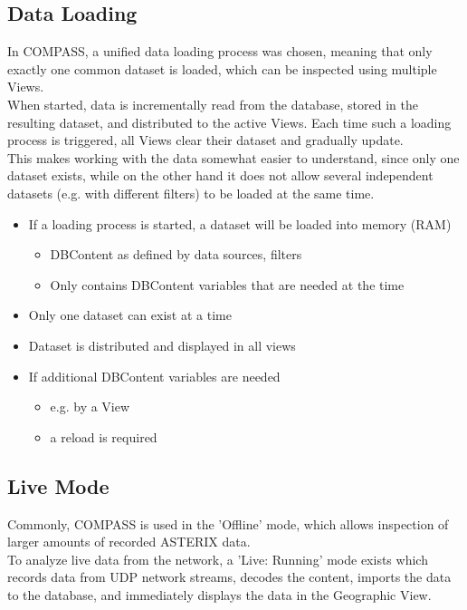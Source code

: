 \subsection*{Data Loading}
In COMPASS, a unified data loading process was chosen, meaning that only exactly one common dataset is loaded, which can be inspected using multiple Views. \\

When started, data is incrementally read from the database, stored in the resulting dataset, and distributed to the active Views. Each time such a loading process is triggered, all Views clear their dataset and gradually update. \\

This makes working with the data somewhat easier to understand, since only one dataset exists, while on the other hand it does not allow several independent datasets (e.g. with different filters) to be loaded at the same time. \\

\begin{itemize}
\item If a loading process is started, a dataset will be loaded into memory (RAM)
\begin{itemize}
\item DBContent as defined by data sources, filters
\item Only contains DBContent variables that are needed at the time
\end{itemize}
\item Only one dataset can exist at a time
\item Dataset is distributed and displayed in all views
\item If additional DBContent variables are needed
\begin{itemize}
\item e.g. by a View
\item a reload is required
\end{itemize}
\end{itemize}

\subsection*{Live Mode}
Commonly, COMPASS is used in the 'Offline' mode, which allows inspection of larger amounts of recorded ASTERIX data. \\

To analyze live data from the network, a 'Live: Running' mode exists which records data from UDP network streams, decodes the content, imports the data to the database, and immediately displays the data in the Geographic View. \\

